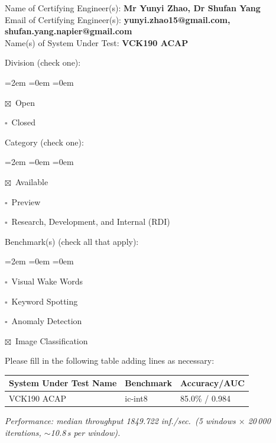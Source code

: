 \documentclass[11pt]{article}
\newcommand{\cb}{$\square$~}            %
\newcommand{\cbx}{$\boxtimes$~}         %
\begin{document}
\vspace*{1.5em}

Name of Certifying Engineer(s): \textbf{Mr Yunyi Zhao, Dr Shufan Yang}\\
Email of Certifying Engineer(s): \textbf{yunyi.zhao15@gmail.com, shufan.yang.napier@gmail.com}\\
Name(s) of System Under Test:   \textbf{VCK190 ACAP}

Division (check one):
\begin{list}{}{\leftmargin=2em \itemsep=0em \topsep=0em}
\item \cbx Open
\item \cb  Closed
\end{list}

Category (check one):
\begin{list}{}{\leftmargin=2em \itemsep=0em \topsep=0em}
\item \cbx Available
\item \cb  Preview
\item \cb  Research, Development, and Internal (RDI)
\end{list}

Benchmark(s) (check all that apply):
\begin{list}{}{\leftmargin=2em \itemsep=0em \topsep=0em}
\item \cb  Visual Wake Words
\item \cb  Keyword Spotting
\item \cb  Anomaly Detection
\item \cbx Image Classification
\end{list}

Please fill in the following table adding lines as necessary:

\begin{center}
\renewcommand{\arraystretch}{1.4}
\begin{tabularx}{\textwidth}{|>{\raggedright\arraybackslash}X|l|l|}
\hline
\textbf{System Under Test Name} & \textbf{Benchmark} & \textbf{Accuracy/AUC} \\
\hline
VCK190 ACAP & ic-int8 & 85.0\% / 0.984 \\
\hline
\end{tabularx}
\end{center}

\textit{Performance: median throughput 1849.722 inf./sec.\ (5 windows
$\times$ 20\,000 iterations, $\sim$10.8\,s per window).}
\end{document}
